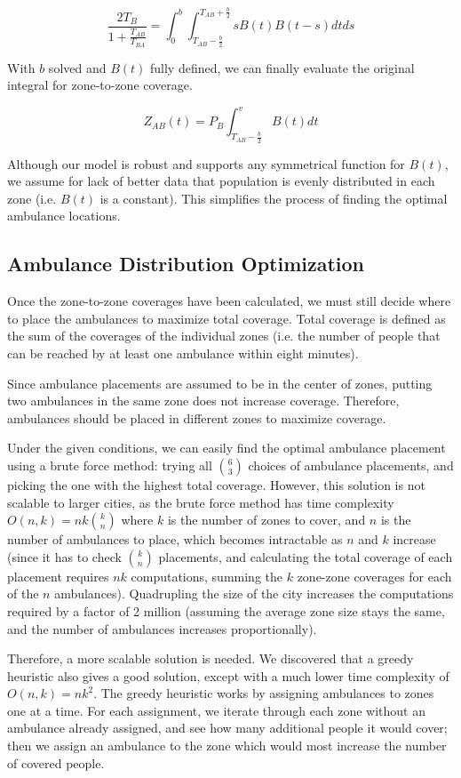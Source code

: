 \documentclass[notitlepage, 12pt]{article}
\begin{document}
$$\frac {2T_B}{1+ \frac{T_{AB}}{T_{BA}}} = \int^b_0 \int^{T_{AB} + \frac{b}{2}}_{T_{AB} - \frac{b}{2}} s B(t) B(t-s) dt ds$$

With $b$ solved and $B(t)$ fully defined, we can finally evaluate the original integral for zone-to-zone coverage.

$$Z_{AB}(t) = P_B \int^v_{T_{AB} - \frac{b}{2}} B(t) dt$$

Although our model is robust and supports any symmetrical function for $B(t)$, we assume for lack of better data that population is evenly distributed in each zone (i.e. $B(t)$ is a constant). This simplifies the process of finding the optimal ambulance locations. 

\subsection{Ambulance Distribution Optimization}
Once the zone-to-zone coverages have been calculated, we must still decide where to place
the ambulances to maximize total coverage. Total coverage is defined as the sum of the coverages
of the individual zones (i.e. the number of people that can be reached by at least one ambulance
within eight minutes).

Since ambulance placements are assumed to be in the center of zones, putting two ambulances in the same
zone does not increase coverage. Therefore, ambulances should be placed in different zones to maximize
coverage.

Under the given conditions, we can easily find the optimal ambulance placement using a brute force
method: trying all $\binom{6}{3}$ choices of ambulance placements, and picking the one with the highest total coverage.
However, this solution is not scalable to larger cities, as the brute force method has time complexity
$O(n, k) = nk\binom{k}{n}$ where $k$ is the number of zones to cover, and $n$ is the number of ambulances to place, which
becomes intractable as $n$ and $k$ increase (since it has to check $\binom{k}{n}$ placements,
and calculating the total coverage of each placement requires $nk$ computations, summing the $k$ zone-zone
coverages for each of the $n$ ambulances). Quadrupling the size of the city
increases the computations required by a factor of 2 million (assuming the average zone size stays the same,
and the number of ambulances increases proportionally).

Therefore, a more scalable solution is needed. We discovered that a greedy heuristic also gives a good solution,
except with a much lower time complexity of $O(n, k) = n k^2$. The greedy heuristic works by assigning ambulances to zones
one at a time. For each assignment, we iterate through each zone without an ambulance already assigned, and see how many
additional people it would cover; then we assign an ambulance to the zone which would most increase the number of
covered people.
\end{document}
